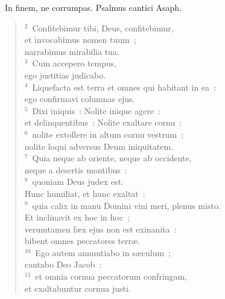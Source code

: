 ~\lettrine[lines=10,image=true,loversize=0.05,lraise=-0.03]{I}{}n finem, ne corrumpas. Psalmus cantici Asaph.
\begin{flushleft}\begin{verse}\vspace{6pt}${}^{2}$~Confitebimur tibi, Deus, confitebimur,\\ et invocabimus nomen tuum~;\\ narrabimus mirabilia tua.\\
${}^{3}$~Cum accepero tempus,\\ ego justitias judicabo.\\
${}^{4}$~Liquefacta est terra et omnes qui habitant in ea~:\\ ego confirmavi columnas ejus.\\
${}^{5}$~Dixi iniquis~: Nolite inique agere~:\\ et delinquentibus~: Nolite exaltare cornu~:\\
${}^{6}$~nolite extollere in altum cornu vestrum~;\\ nolite loqui adversus Deum iniquitatem.\\
${}^{7}$~Quia neque ab oriente, neque ab occidente,\\ neque a desertis montibus~:\\
${}^{8}$~quoniam Deus judex est.\\ Hunc humiliat, et hunc exaltat~:\\
${}^{9}$~quia calix in manu Domini vini meri, plenus misto.\\ Et inclinavit ex hoc in hoc~;\\ verumtamen f\ae x ejus non est exinanita~:\\ bibent omnes peccatores terr\ae .\\
${}^{10}$~Ego autem annuntiabo in s\ae culum~;\\ cantabo Deo Jacob~:\\
${}^{11}$~et omnia cornua peccatorum confringam,\\ et exaltabuntur cornua justi.\end{verse}\end{flushleft}



